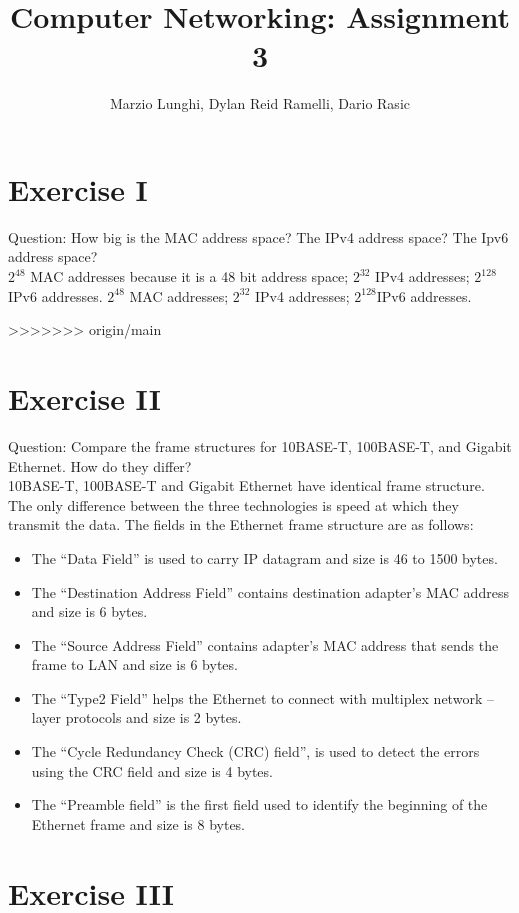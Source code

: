 \documentclass[11pt]{article}
\title{Computer Networking: Assignment 3}
\author{Marzio Lunghi, Dylan Reid Ramelli, Dario Rasic}
\begin{document}
	\maketitle
	\newpage
	\section*{Exercise I}
	Question: How big is the MAC address space? The IPv4 address space? The Ipv6 address space?\\
	$2^{48}$ MAC addresses because it is a 48 bit address space; $2^{32}$ IPv4 addresses; $2^{128}$IPv6 addresses.
	\linebreak
	$2^{48}$ MAC addresses; $2^{32}$ IPv4 addresses; $2^{128}$IPv6 addresses.

>>>>>>> origin/main
	\section*{Exercise II}
	Question: Compare the frame structures for 10BASE-T, 100BASE-T,
	and Gigabit Ethernet. How do they differ?\\
	\linebreak
	10BASE-T, 100BASE-T and Gigabit Ethernet have identical frame structure.
	The only difference between the three technologies is speed at which they transmit the data.
	The fields in the Ethernet frame structure are as follows:
	\begin{itemize}
		\item The “Data Field” is used to carry IP datagram and size is 46 to 1500 bytes.
		\item 	The “Destination Address Field” contains destination adapter’s MAC address and size is 6 bytes.
		\item 	The “Source Address Field” contains adapter’s MAC address that sends the frame to LAN and size is 6 bytes.
		\item 	The “Type2 Field” helps the Ethernet to connect with multiplex network – layer protocols and size is 2 bytes.
		\item The “Cycle Redundancy Check (CRC) field”, is used to detect the errors using the CRC field and size is 4 bytes.
		\item 	The “Preamble field” is the first field used to identify the beginning of the Ethernet frame and size is 8 bytes.
	\end{itemize}

	\section*{Exercise III}
\end{document}
